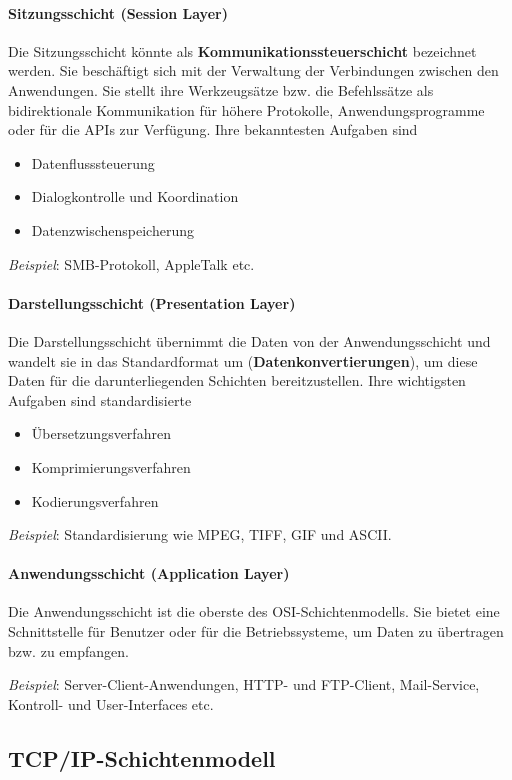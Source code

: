 \paragraph{Sitzungsschicht (Session Layer)} Die Sitzungsschicht könnte als \textbf{Kommunikationssteuerschicht} bezeichnet werden. Sie beschäftigt sich mit der Verwaltung der Verbindungen zwischen den Anwendungen. Sie stellt ihre Werkzeugsätze bzw. die Befehlssätze als bidirektionale Kommunikation für höhere Protokolle, Anwendungsprogramme oder für die APIs zur Verfügung. Ihre bekanntesten Aufgaben sind
\begin{itemize}
	\item Datenflusssteuerung
	\item Dialogkontrolle und Koordination
	\item Datenzwischenspeicherung
\end{itemize}
\textit{Beispiel}: SMB-Protokoll, AppleTalk etc.

\paragraph{Darstellungsschicht (Presentation Layer)} Die Darstellungsschicht übernimmt die Daten von der Anwendungsschicht und wandelt sie in das Standardformat um (\textbf{Datenkonvertierungen}), um diese Daten für die darunterliegenden Schichten bereitzustellen. Ihre wichtigsten Aufgaben sind standardisierte
\begin{itemize}
	\item Übersetzungsverfahren
	\item Komprimierungsverfahren
	\item Kodierungsverfahren
\end{itemize}
\textit{Beispiel}: Standardisierung wie MPEG, TIFF, GIF und ASCII.

\paragraph{Anwendungsschicht (Application Layer)} Die Anwendungsschicht ist die oberste des OSI-Schichtenmodells. Sie bietet eine Schnittstelle für Benutzer oder für die Betriebssysteme, um Daten zu übertragen bzw. zu empfangen. \smallskip \smallskip

\textit{Beispiel}: Server-Client-Anwendungen, HTTP- und FTP-Client, Mail-Service, Kontroll- und User-Interfaces etc.

\subsection{TCP/IP-Schichtenmodell}

